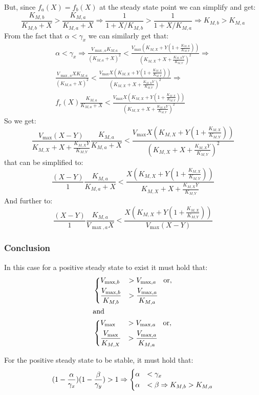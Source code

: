 But, since $f_a(X)=f_b(X)$ at the steady state point we can simplify and get:
\begin{equation*}
    \frac{K_{M,b}}{K_{M,b}+X}>\frac{K_{M,a}}{K_{M,a}+X} \Rightarrow \frac{1}{1+X/K_{M,b}}>\frac{1}{1+X/K_{M,a}} \Rightarrow K_{M,b}>K_{M,a}
\end{equation*}
From the fact that $\alpha<\gamma_x$ we can similarly get that:
\begin{align*}
\alpha<\gamma_x \Rightarrow
\frac{V_{\max,a}K_{M,a}}{(K_{M,a}+X)^2} < \frac{V_{\max}(K_{M,X}+Y(1+\frac{K_{M,X}}{K_{M,Y}}))}{(K_{M,X}+X+\frac{K_{M,X}Y}{K_{M,Y}})^2}
\Rightarrow \\
\frac{V_{\max,a}XK_{M,a}}{(K_{M,a}+X)^2}<\frac{V_{\max}X(K_{M,X}+Y(1+\frac{K_{M,X}}{K_{M,Y}}))}{(K_{M,X}+X+\frac{K_{M,X}Y}{K_{M,Y}})^2}
\Rightarrow \\
f_r(X)\frac{K_{M,a}}{K_{M,a}+X}<\frac{V_{\max}X(K_{M,X}+Y(1+\frac{K_{M,X}}{K_{M,Y}}))}{(K_{M,X}+X+\frac{K_{M,X}Y}{K_{M,Y}})^2}
\end{align*}
So we get:
\begin{equation*}
\frac{V_{\max}(X-Y)}{K_{M,X}+X+\frac{K_{M,X}Y}{K_{M,Y}}}\frac{K_{M,a}}{K_{M,a}+X}<\frac{V_{\max}X(K_{M,X}+Y(1+\frac{K_{M,X}}{K_{M,Y}}))}{(K_{M,X}+X+\frac{K_{M,X}Y}{K_{M,Y}})^2}
\end{equation*}
that can be simplified to:
\begin{equation*}
\frac{(X-Y)}{1}\frac{K_{M,a}}{K_{M,a}+X}<\frac{X(K_{M,X}+Y(1+\frac{K_{M,X}}{K_{M,Y}}))}{K_{M,X}+X+\frac{K_{M,X}Y}{K_{M,Y}}}
\end{equation*}
And further to:
\begin{equation*}
    \frac{(X-Y)}{1}\frac{K_{M,a}}{V_{\max,a}X}<\frac{X(K_{M,X}+Y(1+\frac{K_{M,X}}{K_{M,Y}}))}{V_{\max}(X-Y)}
\end{equation*}
\subsubsection{Conclusion}
In this case for a positive steady state to exist it must hold that:
\begin{align*}
    &\begin{dcases}
        V_{\max,b} &> V_{\max,a} \quad \text{or}, \\
        \frac{V_{\max,b}}{K_{M,b}} &>\frac{V_{\max,a}}{K_{M,a}}
    \end{dcases}\\
    &\text{and} \\
  &\begin{dcases}
        V_{\max} &> V_{\max,a} \quad \text{or}, \\
        \frac{V_{\max}}{K_{M,X}} &>\frac{V_{\max,a}}{K_{M,a}}
    \end{dcases}
\end{align*}

For the positive steady state to be stable, it must hold that:
\begin{align*}
(1-\frac{\alpha}{\gamma_x})(1-\frac{\beta}{\gamma_y})>1 \Rightarrow
    \begin{dcases}
        \alpha &< \gamma_x \\
        \alpha &< \beta \Rightarrow K_{M,b}>K_{M,a}
    \end{dcases}
\end{align*}
